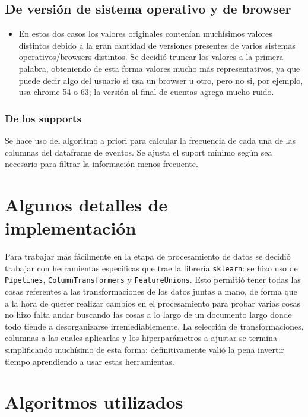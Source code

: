 \documentclass[a4paper]{article}
\begin{document}
        \subsection{De versión de sistema operativo y de browser}
        \begin{itemize}
            \item En estos dos casos los valores originales contenían muchísimos valores distintos debido a la gran cantidad de versiones presentes de varios sistemas operativos/browsers distintos. Se decidió truncar los valores a la primera palabra, obteniendo de esta forma valores mucho más representativos, ya que puede decir algo del usuario si usa un browser u otro, pero no si, por ejemplo, usa chrome 54 o 63; la versión al final de cuentas agrega mucho ruido.
        \end{itemize}

        \subsubsection{De los supports}\label{subsubsec:supports}
        
        Se hace uso del algoritmo a priori para calcular la frecuencia de cada una de las columnas del dataframe de eventos. Se ajusta el suport mínimo según sea necesario para filtrar la información menos frecuente.
    
\section{Algunos detalles de implementación}
Para trabajar más fácilmente en la etapa de procesamiento de datos se decidió trabajar con herramientas específicas que trae la librería \texttt{sklearn}: se hizo uso de \texttt{Pipelines}, \texttt{ColumnTransformers} y \texttt{FeatureUnions}. Esto permitió tener todas las cosas referentes a las transformaciones de los datos juntas a mano, de forma que a la hora de querer realizar cambios en el procesamiento para probar varias cosas no hizo falta andar buscando las cosas a lo largo de un documento largo donde todo tiende a desorganizarse irremediablemente. La selección de transformaciones, columnas a las cuales aplicarlas y los hiperparámetros a ajustar se termina simplificando muchísimo de esta forma: definitivamente valió la pena invertir tiempo aprendiendo a usar estas herramientas.

\section{Algoritmos utilizados}\label{sec:algoritmos}
    
\end{document}
